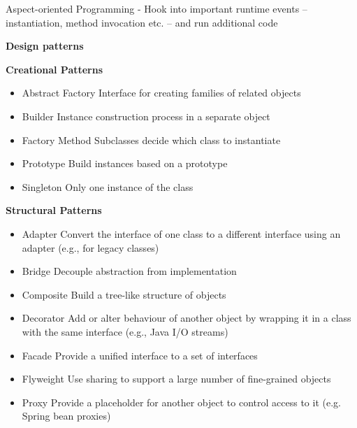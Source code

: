Aspect-oriented Programming - Hook into important runtime events – instantiation, method invocation etc. – and run additional code

\textbf{Design patterns}

\textbf{Creational Patterns}
\begin{itemize}
    \item Abstract Factory Interface for creating families of related objects
    \item Builder Instance construction process in a separate object
    \item Factory Method Subclasses decide which class to instantiate
    \item Prototype Build instances based on a prototype
    \item Singleton Only one instance of the class
\end{itemize}

\textbf{Structural Patterns}
\begin{itemize}
    \item Adapter Convert the interface of one class to a different interface using an adapter (e.g., for legacy classes)
    \item Bridge Decouple abstraction from implementation
    \item Composite Build a tree-like structure of objects
    \item Decorator Add or alter behaviour of another object by wrapping it in a class with the same interface (e.g., Java I/O streams)
    \item Facade Provide a unified interface to a set of interfaces
    \item Flyweight Use sharing to support a large number of fine-grained objects
    \item Proxy Provide a placeholder for another object to control access to it (e.g. Spring bean proxies)
\end{itemize}

